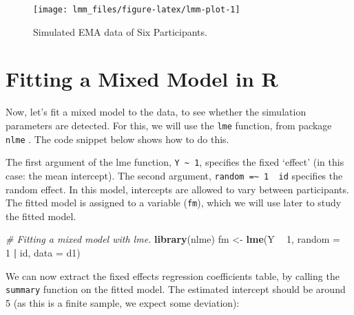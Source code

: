 \documentclass[]{book}
\newenvironment{Shaded}{\begin{snugshade}}{\end{snugshade}}
\newcommand{\KeywordTok}[1]{\textcolor[rgb]{0.13,0.29,0.53}{\textbf{#1}}}
\newcommand{\DataTypeTok}[1]{\textcolor[rgb]{0.13,0.29,0.53}{#1}}
\newcommand{\DecValTok}[1]{\textcolor[rgb]{0.00,0.00,0.81}{#1}}
\newcommand{\StringTok}[1]{\textcolor[rgb]{0.31,0.60,0.02}{#1}}
\newcommand{\CommentTok}[1]{\textcolor[rgb]{0.56,0.35,0.01}{\textit{#1}}}
\newcommand{\OperatorTok}[1]{\textcolor[rgb]{0.81,0.36,0.00}{\textbf{#1}}}
\newcommand{\NormalTok}[1]{#1}
\begin{document}
\begin{figure}

{\centering \texttt{[image: lmm\_files/figure-latex/lmm-plot-1]} 

}

\caption{Simulated EMA data of Six Participants.}\label{fig:lmm-plot}
\end{figure}

\section{Fitting a Mixed Model in R}\label{fitting-a-mixed-model-in-r}


Now, let's fit a mixed model to the data, to see whether the simulation
parameters are detected. For this, we will use the \texttt{lme}
function, from package \texttt{nlme} \citep{R-nlme}. The code snippet
below shows how to do this.

The first argument of the lme function,
\texttt{Y\ \textasciitilde{}\ 1}, specifies the fixed `effect' (in this
case: the mean intercept). The second argument,
\texttt{random\ =\textasciitilde{}\ 1\ \textbar{}\ id} specifies the
random effect. In this model, intercepts are allowed to vary between
participants. The fitted model is assigned to a variable (\texttt{fm}),
which we will use later to study the fitted model.

\begin{Shaded}
\begin{Highlighting}[]
\CommentTok{# Fitting a mixed model with lme.}
\KeywordTok{library}\NormalTok{(nlme)}
\NormalTok{fm <-}\StringTok{ }\KeywordTok{lme}\NormalTok{(Y }\OperatorTok{~}\StringTok{ }\DecValTok{1}\NormalTok{, }\DataTypeTok{random =} \OperatorTok{~}\StringTok{ }\DecValTok{1} \OperatorTok{|}\StringTok{ }\NormalTok{id, }
          \DataTypeTok{data =}\NormalTok{ d1)}
\end{Highlighting}
\end{Shaded}

We can now extract the fixed effects regression coefficients table, by
calling the \texttt{summary} function on the fitted model. The estimated
intercept should be around 5 (as this is a finite sample, we expect some
deviation):

\begin{Shaded}
\end{Shaded}
\end{document}
